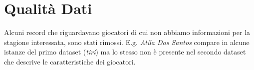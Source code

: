 \chapter{Qualità Dati}

Alcuni record che riguardavano giocatori di cui non abbiamo informazioni per la stagione interessata, sono stati rimossi. E.g. \textit{Atila Dos Santos} compare in alcune istanze del primo dataset (\textit{tiri}) ma lo stesso non è presente nel secondo dataset che descrive le caratteristiche dei giocatori.